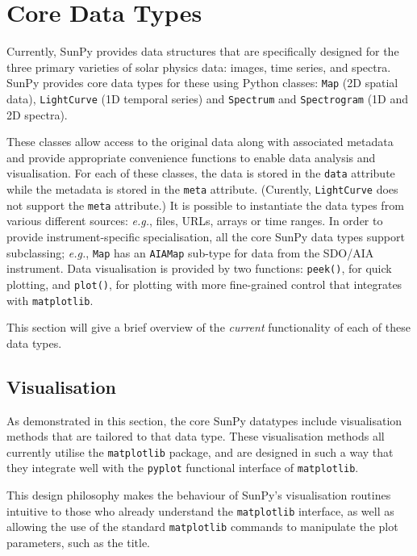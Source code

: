 \section{Core Data Types}\label{sec:DataTypes}

Currently, SunPy provides data structures that are specifically designed for the
three primary varieties of solar physics data: images, time series, and
spectra. SunPy provides core data types for these using Python classes:
\texttt{Map} (2D spatial data), \texttt{LightCurve} (1D temporal series)
and \texttt{Spectrum} and \texttt{Spectrogram} (1D and 2D spectra). 

These classes allow access to the original data
along with associated metadata and provide appropriate convenience functions to
enable data analysis and visualisation. For each of these classes, the data is
stored in the \texttt{data} attribute while the metadata is stored 
in the \texttt{meta} attribute. (Curently, \texttt{LightCurve} does 
not support the \texttt{meta} attribute.) It is possible to instantiate the
data types from various
different sources: \textit{e.g.}, files, URLs, arrays or time ranges.  In order 
to provide instrument-specific specialisation, all the core SunPy data types 
support subclassing; \textit{e.g.}, \texttt{Map} has an \texttt{AIAMap} 
sub-type for data from the SDO/AIA instrument. 
Data visualisation is provided by two functions: \texttt{peek()}, for quick 
plotting, and \texttt{plot()}, for plotting with more fine-grained control that 
integrates with \texttt{matplotlib}.


This section will give a brief overview of the \textit{current} functionality 
of each of these data types.





\subsection{Visualisation}
\label{subsec:Viz}
As demonstrated in this section, the core SunPy datatypes 
include visualisation methods that are tailored to that data type. 
These visualisation methods all currently utilise the \texttt{matplotlib} 
package, and are designed in such a way that they integrate well with 
the \texttt{pyplot} functional interface of \texttt{matplotlib}.

This design philosophy makes the behaviour of SunPy's visualisation 
routines intuitive to those who already understand the \texttt{matplotlib}
interface, as well as allowing the use of the standard 
\texttt{matplotlib} commands to manipulate the plot parameters, such as the 
title.